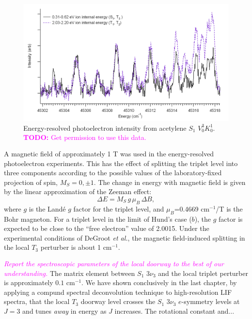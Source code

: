 \documentclass[12pt]{mitthesis}
\newcommand{\TODO} [1]{\textcolor{magenta}{\textbf{TODO:} #1}}
\newcommand{\POINT}[1]{\textcolor{magenta}{\emph{#1}}}
\newcommand{\rcm}{cm$^{-1}$}
\begin{document}
\begin{figure}
  \includegraphics[scale=0.8]{mattijs-traces-3n3.png}
  \caption{Energy-resolved photoelectron intensity from acetylene
    $S_1$ $V^3_0K^1_0$.  \TODO{Get permission to use this data.}}
  \label{fig:mattijs-traces}
\end{figure}


A magnetic field of approximately 1 T was used in the energy-resolved
photoelectron experiments.  This has the effect of splitting the
triplet level into three components according to the possible values
of the laboratory-fixed projection of spin, $M_S=0,\pm 1$.  The change
in energy with magnetic field is given by the linear approximation of
the Zeeman effect:
\begin{equation}
  \Delta E = M_S \, g \, \mu_B \, \Delta B,
\end{equation}
where $g$ is the Land\'{e} $g$ factor for the triplet level, and
$\mu_B$=0.4669 cm$^{-1}$/T is the Bohr magneton.  For a triplet level
in the limit of Hund's case ($b$), the $g$ factor is expected to be
close to the ``free electron'' value of 2.0015.  Under the
experimental conditions of DeGroot \emph{et al.}, the magnetic
field-induced splitting in the local $T_3$ perturber is about 1
cm$^{-1}$.

\POINT{}

\POINT{Report the spectroscopic parameters of the local doorway to the
  best of our understanding.}  The matrix element between $S_1$
$3\nu_3$ and the local triplet perturber is approximately $0.1$ \rcm.
We have shown conclusively in the last chapter, by applying a compund
spectral deconvolution technique to high-resolution LIF spectra, that
the local $T_3$ doorway level crosses the $S_1$ $3\nu_3$ $e$-symmetry
levels at $J=3$ and tunes \emph{away} in energy as $J$ increases.  The
rotational constant and...
\end{document}
